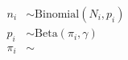 \documentclass[preview]{standalone}
\begin{document}
\begin{align}
  n_i   &\sim \mathrm{Binomial}(N_i, p_i) \\
  p_i   &\sim \mathrm{Beta}(\pi_i, \gamma) \\
  \pi_i &\sim 
\end{align}
\end{document}
